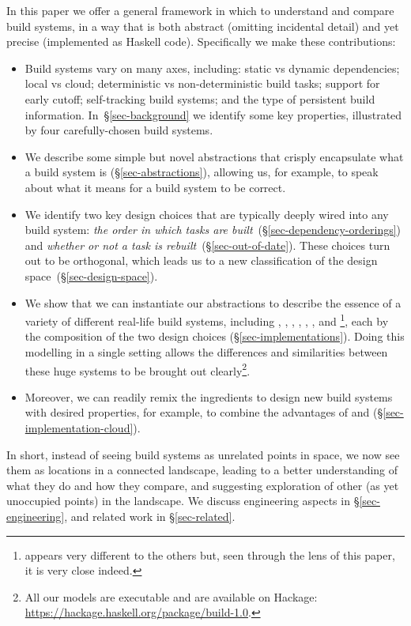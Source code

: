 In this paper we offer a general framework in which to understand and compare
build systems, in a way that is both abstract (omitting incidental detail)
and yet precise (implemented as Haskell code). Specifically we make these
contributions:
\begin{itemize}
\item Build systems vary on many axes, including: static vs dynamic
  dependencies; local vs cloud; deterministic vs non-deterministic build tasks;
  support for early cutoff; self-tracking build systems; and the type of
  persistent build information. In~\S\ref{sec-background} we identify some key
  properties, illustrated by four carefully-chosen build systems.

\item We describe some simple but novel abstractions that
  crisply encapsulate what a build system is (\S\ref{sec-abstractions}),
  allowing us, for example, to speak about what it means for a build system to be correct.

\item We identify two key design choices that are typically deeply wired into
  any build system: \emph{the order in which tasks are
  built}~(\S\ref{sec-dependency-orderings}) and \emph{whether or not a
  task is rebuilt}~(\S\ref{sec-out-of-date}). These choices turn out to
  be orthogonal, which leads us to a new classification of the design
  space~(\S\ref{sec-design-space}).

\item We show that we can instantiate our abstractions to describe the essence
of a variety of different real-life build systems, including \Make, \Shake,
\Bazel, \CloudBuild, \Buck, \Nix, and \Excel\footnote{\Excel appears very
different to the others but, seen through the lens of this paper, it is very
close indeed.}, each by the composition of the two design choices
(\S\ref{sec-implementations}). Doing this modelling in a single setting
allows the differences and similarities between these huge systems to be
brought out clearly\footnote{All our models are executable and are available on
Hackage: \url{https://hackage.haskell.org/package/build-1.0}.}.

\item Moreover, we can readily remix the ingredients to design new build systems
with desired properties, for example, to combine the advantages of \Shake and
\Bazel (\S\ref{sec-implementation-cloud}).

\end{itemize}
In short, instead of seeing build systems as unrelated
points in space, we now see them as locations in a connected landscape,
leading to a better understanding of what they do and how they compare,
and suggesting exploration of other (as yet unoccupied points) in the
landscape.
We discuss engineering aspects in \S\ref{sec-engineering}, and related
work in \S\ref{sec-related}.

